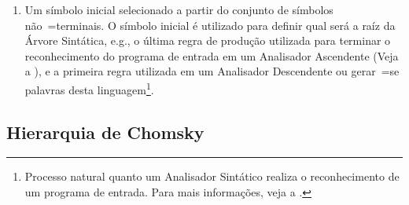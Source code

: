 \begin{enumerate}
    \item Um símbolo inicial selecionado a partir do conjunto de símbolos não~=terminais.
    O símbolo inicial é utilizado para definir qual será a raíz da Árvore Sintática,
    e.g.,
    o última regra de produção utilizada para terminar o reconhecimento do programa de entrada em um Analisador Ascendente (Veja a ),
    e a primeira regra utilizada em um Analisador Descendente ou
    gerar~=se palavras desta linguagem\footnote{
    Processo natural quanto um Analisador Sintático realiza o reconhecimento de um programa de entrada.
    Para mais informações,
    veja a .
    }.
\end{enumerate}


\subsection{Hierarquia de Chomsky}
\label{hierarquiaDeChomsky}

